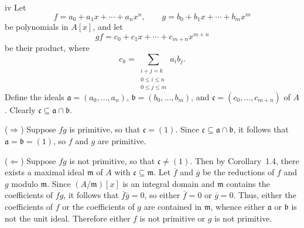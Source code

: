 \begin{partsolution}{iv}
Let
\begin{equation*}
f = a_0 + a_1 x + \cdots + a_n x^n,
\qquad
g = b_0 + b_1 x + \cdots + b_m x^m
\end{equation*}
be polynomials in \(A[x]\), and let
\begin{equation*}
g f = c_0 + c_1 x + \cdots + c_{m+n} x^{m+n}
\end{equation*}
be their product, where
\begin{equation*}
c_k = \sum_{\substack{i+j=k \\ 0\leq i\leq n\\0\leq j\leq m}} a_i b_j.
\end{equation*}
Define the ideals \(\mathfrak a = (a_0,\ldots,a_n)\), \(\mathfrak b = (b_0,\ldots,b_m)\), and \(\mathfrak c = (c_0,\ldots,c_{m+n})\) of \(A\).
Clearly \(\mathfrak c \subseteq \mathfrak a \cap \mathfrak b\).

(\(\Rightarrow\))
Suppose \(f g\) is primitive, so that \(\mathfrak c = (1)\).
Since \(\mathfrak c \subseteq \mathfrak a \cap \mathfrak b\), it follows that \(\mathfrak a = \mathfrak b = (1)\), so \(f\) and \(g\) are primitive.

(\(\Leftarrow\))
Suppose \(f g\) is not primitive, so that \(\mathfrak c \neq (1)\).
Then by Corollary~1.4, there exists a maximal ideal \(\mathfrak m\) of \(A\) with \(\mathfrak c \subseteq \mathfrak m\).
Let \(\overline f\) and \(\overline g\) be the reductions of \(f\) and \(g\) modulo \(\mathfrak m\).
Since \((A/\mathfrak m)[x]\) is an integral domain and \(\mathfrak m\) contains the coefficients of \(f g\), it follows that \(\overline f \overline g = 0\), so either \(\overline f = 0\) or \(\overline g = 0\).
Thus, either the coefficients of \(f\) or the coefficients of \(g\) are contained in \(\mathfrak m\), whence either \(\mathfrak a\) or \(\mathfrak b\) is not the unit ideal.
Therefore either \(f\) is not primitive or \(g\) is not primitive.
\end{partsolution}